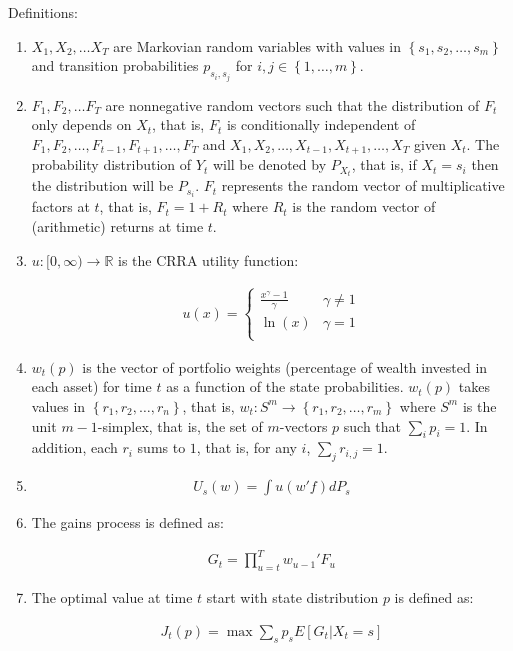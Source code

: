 \documentclass{article}
\begin{document}
Definitions:

\begin{enumerate}
  \item
    $X_1, X_2, \ldots X_T$ are Markovian random variables with values in $\left\{s_1, s_2, \ldots, s_m\right\}$ and transition probabilities $p_{s_i,s_j}$ for $i,j\in\left\{1,\ldots,m\right\}$.
  \item
    $F_1, F_2, \ldots F_T$ are nonnegative random vectors such that the distribution of $F_t$ only depends on $X_t$, that is, $F_t$ is conditionally independent of $F_1, F_2, \ldots, F_{t-1}, F_{t+1}, \ldots, F_T$ and $X_1, X_2, \ldots, X_{t-1}, X_{t+1}, \ldots, X_T$ given $X_t$.
    The probability distribution of $Y_t$ will be denoted by $P_{X_t}$, that is, if $X_t=s_i$ then the distribution will be $P_{s_i}$.
    $F_t$ represents the random vector of multiplicative factors at $t$, that is, $F_t = 1 + R_t$ where $R_t$ is the random vector of (arithmetic) returns at time $t$.

  \item
    $u:[0,\infty)\rightarrow\mathbb{R}$ is the CRRA utility function:

    \begin{eqnarray*}
      u(x) = \left\{\begin{array}{ll}
      \frac{x^\gamma - 1}{\gamma} & \gamma\ne 1\\
      \ln(x) & \gamma = 1\\
      \end{array}\right.
    \end{eqnarray*}

  \item
    $w_t(p)$ is the vector of portfolio weights (percentage of wealth invested in each asset) for time $t$ as a function of the state probabilities.
    $w_t(p)$ takes values in $\left\{r_1, r_2, \ldots, r_n\right\}$, that is, $w_t:S^m \rightarrow\left\{r_1,r_2,\ldots,r_m\right\}$ where $S^m$ is the unit $m-1$-simplex, that is, the set of $m$-vectors $p$ such that $\sum_i p_i = 1$.
    In addition, each $r_i$ sums to $1$, that is, for any $i$, $\sum_j r_{i,j} = 1$.

  \item
    \begin{eqnarray*}
      U_s\left(w\right) = \int u\left(w'f\right)dP_s
    \end{eqnarray*}

    \item
      The gains process is defined as:

      \begin{eqnarray*}
        G_t = \prod_{u=t}^T w_{u-1}' F_u
      \end{eqnarray*}

      \item
        The optimal value at time $t$ start with state distribution $p$ is defined as:

        \begin{eqnarray*}
          J_t(p) = \max \sum_s p_s E\left[\left.G_t\right|X_t=s\right]
        \end{eqnarray*}

\end{enumerate}
\end{document}
